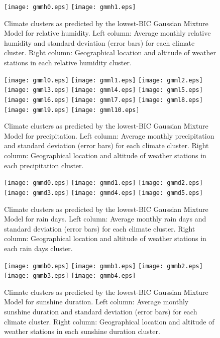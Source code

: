\documentclass[12pt]{iopart}
\begin{document}
\begin{figure}
\begin{center}
\texttt{[image: gmmh0.eps]}
\texttt{[image: gmmh1.eps]}
\caption{Climate clusters as predicted by the lowest-BIC Gaussian Mixture Model for relative humidity. Left column: Average monthly relative humidity and standard deviation (error bars) for each climate cluster. Right column: Geographical location and altitude of weather stations in each relative humidity cluster.}\label{clusth}
\end{center}
\end{figure}

\begin{figure}
\begin{center}
\texttt{[image: gmml0.eps]}
\texttt{[image: gmml1.eps]}
\texttt{[image: gmml2.eps]}
\texttt{[image: gmml3.eps]}
\texttt{[image: gmml4.eps]}
\texttt{[image: gmml5.eps]}
\texttt{[image: gmml6.eps]}
\texttt{[image: gmml7.eps]}
\texttt{[image: gmml8.eps]}
\texttt{[image: gmml9.eps]}
\texttt{[image: gmml10.eps]}
\caption{Climate clusters as predicted by the lowest-BIC Gaussian Mixture Model for precipitation. Left column: Average monthly precipitation and standard deviation (error bars) for each climate cluster. Right column: Geographical location and altitude of weather stations in each precipitation cluster.}\label{clustl}
\end{center}
\end{figure}

\begin{figure}
\begin{center}
\texttt{[image: gmmd0.eps]}
\texttt{[image: gmmd1.eps]}
\texttt{[image: gmmd2.eps]}
\texttt{[image: gmmd3.eps]}
\texttt{[image: gmmd4.eps]}
\texttt{[image: gmmd5.eps]}
\caption{Climate clusters as predicted by the lowest-BIC Gaussian Mixture Model for rain days. Left column: Average monthly rain days and standard deviation (error bars) for each climate cluster. Right column: Geographical location and altitude of weather stations in each rain days cluster.}\label{clustl}
\end{center}
\end{figure}

\begin{figure}
\begin{center}
\texttt{[image: gmmb0.eps]}
\texttt{[image: gmmb1.eps]}
\texttt{[image: gmmb2.eps]}
\texttt{[image: gmmb3.eps]}
\texttt{[image: gmmb4.eps]}
\caption{Climate clusters as predicted by the lowest-BIC Gaussian Mixture Model for sunshine duration. Left column: Average monthly sunshine duration and standard deviation (error bars) for each climate cluster. Right column: Geographical location and altitude of weather stations in each sunshine duration cluster.}\label{clustl}
\end{center}
\end{figure}
\end{document}
